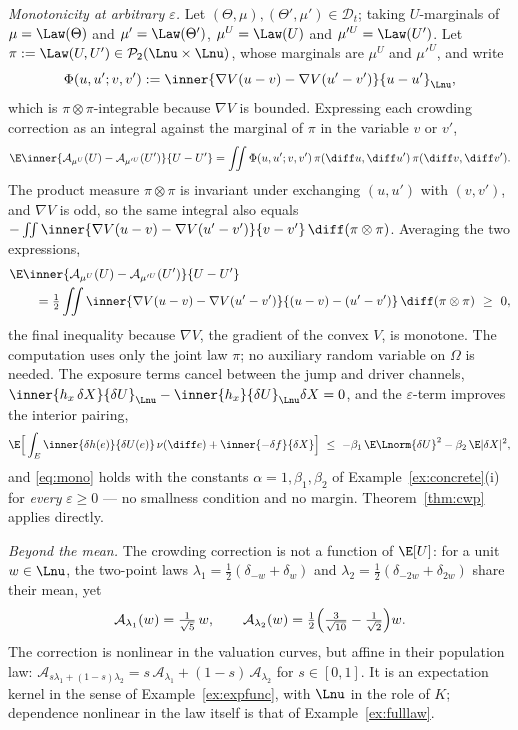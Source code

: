 \begin{example}
\smallskip
\emph{Monotonicity at arbitrary $\varepsilon$.} Let
$(\Theta,\mu),(\Theta',\mu')\in\mathcal D_t$; taking $U$-marginals of $\mu=\Law(\Theta)$
and $\mu'=\Law(\Theta')$, $\mu^U=\Law(U)$ and $\mu'^U=\Law(U')$. Let
$\pi:=\Law(U,U')\in\mathcal P_2(\Lnu\times\Lnu)$, whose marginals are $\mu^U$ and
$\mu'^U$, and write
\[
\Phi(u,u';v,v'):=\inner{\nabla V(u-v)-\nabla V(u'-v')}{u-u'}_{\Lnu},
\]
which is $\pi\otimes\pi$-integrable because $\nabla V$ is bounded. Expressing each
crowding correction as an integral against the marginal of $\pi$ in the variable $v$ or $v'$,
\[
\E\inner{\mathcal A_{\mu^U}(U)-\mathcal A_{\mu'^U}(U')}{U-U'}
=\iint\Phi(u,u';v,v')\,\pi(\diff u,\diff u')\,\pi(\diff v,\diff v') .
\]
The product measure $\pi\otimes\pi$ is invariant under exchanging $(u,u')$ with $(v,v')$,
and $\nabla V$ is odd, so the same integral also equals
$-\iint\inner{\nabla V(u-v)-\nabla V(u'-v')}{v-v'}\,\diff(\pi\otimes\pi)$. Averaging the
two expressions,
\[
\begin{aligned}
&\E\inner{\mathcal A_{\mu^U}(U)-\mathcal A_{\mu'^U}(U')}{U-U'}\\
&\qquad=\tfrac12\iint\inner{\nabla V(u-v)-\nabla V(u'-v')}
{(u-v)-(u'-v')}\,\diff(\pi\otimes\pi)\ \ge\ 0,
\end{aligned}
\]
the final inequality because $\nabla V$, the gradient of the convex $V$, is monotone. The
computation uses only the joint law $\pi$; no auxiliary random variable on $\Omega$ is
needed.
The exposure terms cancel between the jump and driver channels,
$\inner{h_x\,\delta X}{\delta U}_{\Lnu}-\inner{h_x}{\delta U}_{\Lnu}\delta X=0$, and the
$\varepsilon$-term improves the interior pairing,
\[
\E\Big[\int_E\inner{\delta h(e)}{\delta U(e)}\,\nu(\diff e)+\inner{-\delta f}{\delta X}\Big]
\ \le\ -\beta_1\,\E\Lnorm{\delta U}^2-\beta_2\,\E|\delta X|^2 ,
\]
and \eqref{eq:mono} holds with the constants $\alpha=1,\beta_1,\beta_2$ of
Example~\ref{ex:concrete}(i) for \emph{every} $\varepsilon\ge0$ --- no smallness
condition and no margin. Theorem~\ref{thm:cwp} applies directly.

\smallskip
\emph{Beyond the mean.} The crowding correction is not a function of $\E[U]$: for a
unit $w\in\Lnu$, the two-point laws $\lambda_1=\tfrac12(\delta_{-w}+\delta_{w})$ and
$\lambda_2=\tfrac12(\delta_{-2w}+\delta_{2w})$ share their mean, yet
\[
\mathcal A_{\lambda_1}(w)=\tfrac{1}{\sqrt5}\,w,\qquad
\mathcal A_{\lambda_2}(w)=\tfrac12\Bigl(\tfrac{3}{\sqrt{10}}-\tfrac1{\sqrt2}\Bigr)w .
\]
The correction is nonlinear in the valuation curves, but affine in their population law:
$\mathcal A_{s\lambda_1+(1-s)\lambda_2}=s\,\mathcal A_{\lambda_1}+(1-s)\,\mathcal A_{\lambda_2}$
for $s\in[0,1]$. It is an expectation kernel in the sense of Example~\ref{ex:expfunc}, with
$\Lnu$ in the role of $K$; dependence nonlinear in the law itself is that of
Example~\ref{ex:fulllaw}.


\end{example}
